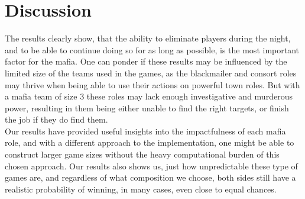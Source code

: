 \section{Discussion}\label{sec:discussion}
The results clearly show, that the ability to eliminate players during the 
night, and to be able to continue doing so for as long as possible, is the most 
important factor for the mafia. One can ponder if these results may be 
influenced by the limited size of the
teams used in the games, as the blackmailer and consort roles may thrive when
being able to use their actions on powerful town roles. But with a mafia team
of size 3 these roles may lack enough investigative and murderous power,
resulting in them being either unable to find the right targets, or finish the
job if they do find them.\\ Our results have provided useful insights into the
impactfulness of each mafia role, and with a different approach to the
implementation, one might be able to construct larger game sizes without the
heavy computational burden of this chosen approach. Our results also shows us,
just how unpredictable these type of games are, and regardless of what
composition we choose, both sides still have a realistic probability of
winning, in many cases, even close to equal chances.
